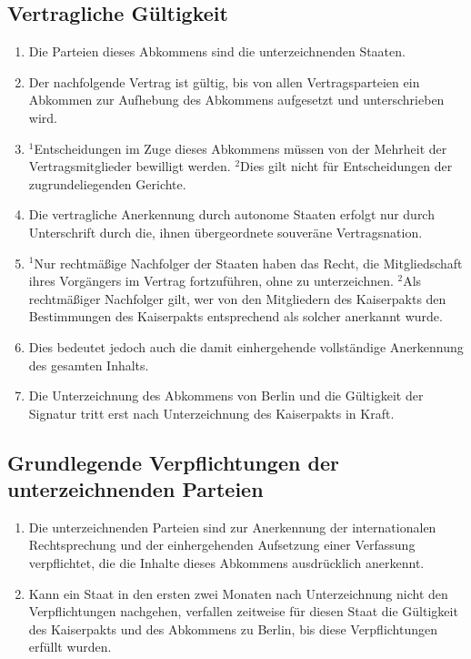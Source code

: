 \documentclass{article}
\begin{document}
\subsection{Vertragliche Gültigkeit}
\begin{enumerate}[(1)]
    \item Die Parteien dieses Abkommens sind die unterzeichnenden Staaten.
    \item Der nachfolgende Vertrag ist gültig, bis von allen Vertragsparteien ein Abkommen zur Aufhebung des Abkommens aufgesetzt und unterschrieben wird.
    \item ${^1}$Entscheidungen im Zuge dieses Abkommens müssen von der Mehrheit der Vertragsmitglieder bewilligt werden. ${^2}$Dies gilt nicht für Entscheidungen der zugrundeliegenden Gerichte.
    \item Die vertragliche Anerkennung durch autonome Staaten erfolgt nur durch Unterschrift durch die, ihnen übergeordnete souveräne Vertragsnation.
    \item ${^1}$Nur rechtmäßige Nachfolger der Staaten haben das Recht, die Mitgliedschaft ihres Vorgängers im Vertrag fortzuführen, ohne zu unterzeichnen. ${^2}$Als rechtmäßiger Nachfolger gilt, wer von den Mitgliedern des Kaiserpakts den Bestimmungen des Kaiserpakts entsprechend als solcher anerkannt wurde.
    \item Dies bedeutet jedoch auch die damit einhergehende vollständige Anerkennung des gesamten Inhalts.
    \item Die Unterzeichnung des Abkommens von Berlin und die Gültigkeit der Signatur tritt erst nach Unterzeichnung des Kaiserpakts in Kraft. 
\end{enumerate}

\subsection{Grundlegende Verpflichtungen der unterzeichnenden Parteien}
\begin{enumerate}[(1)]
    \item Die unterzeichnenden Parteien sind zur Anerkennung der internationalen Rechtsprechung und der einhergehenden Aufsetzung einer Verfassung verpflichtet, die die Inhalte dieses Abkommens ausdrücklich anerkennt.
    \item Kann ein Staat in den ersten zwei Monaten nach Unterzeichnung nicht den Verpflichtungen nachgehen, verfallen zeitweise für diesen Staat die Gültigkeit des Kaiserpakts und des Abkommens zu Berlin, bis diese Verpflichtungen erfüllt wurden.
\end{enumerate}
\end{document}
